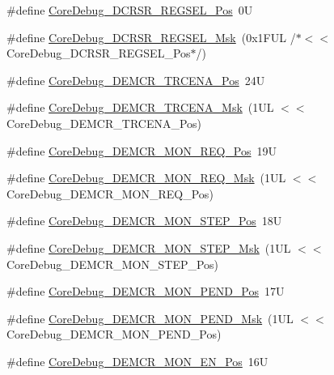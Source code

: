 \begin{DoxyCompactItemize}
\#define \hyperlink{group___c_m_s_i_s___core_debug_ga52182c8a9f63a52470244c0bc2064f7b}{Core\+Debug\+\_\+\+D\+C\+R\+S\+R\+\_\+\+R\+E\+G\+S\+E\+L\+\_\+\+Pos}~0U
\item 
\#define \hyperlink{group___c_m_s_i_s___core_debug_ga17cafbd72b55030219ce5609baa7c01d}{Core\+Debug\+\_\+\+D\+C\+R\+S\+R\+\_\+\+R\+E\+G\+S\+E\+L\+\_\+\+Msk}~(0x1\+F\+U\+L /$\ast$$<$$<$ Core\+Debug\+\_\+\+D\+C\+R\+S\+R\+\_\+\+R\+E\+G\+S\+E\+L\+\_\+\+Pos$\ast$/)
\item 
\#define \hyperlink{group___c_m_s_i_s___core_debug_ga6ff2102b98f86540224819a1b767ba39}{Core\+Debug\+\_\+\+D\+E\+M\+C\+R\+\_\+\+T\+R\+C\+E\+N\+A\+\_\+\+Pos}~24U
\item 
\#define \hyperlink{group___c_m_s_i_s___core_debug_ga5e99652c1df93b441257389f49407834}{Core\+Debug\+\_\+\+D\+E\+M\+C\+R\+\_\+\+T\+R\+C\+E\+N\+A\+\_\+\+Msk}~(1\+U\+L $<$$<$ Core\+Debug\+\_\+\+D\+E\+M\+C\+R\+\_\+\+T\+R\+C\+E\+N\+A\+\_\+\+Pos)
\item 
\#define \hyperlink{group___c_m_s_i_s___core_debug_ga341020a3b7450416d72544eaf8e57a64}{Core\+Debug\+\_\+\+D\+E\+M\+C\+R\+\_\+\+M\+O\+N\+\_\+\+R\+E\+Q\+\_\+\+Pos}~19U
\item 
\#define \hyperlink{group___c_m_s_i_s___core_debug_gae6384cbe8045051186d13ef9cdeace95}{Core\+Debug\+\_\+\+D\+E\+M\+C\+R\+\_\+\+M\+O\+N\+\_\+\+R\+E\+Q\+\_\+\+Msk}~(1\+U\+L $<$$<$ Core\+Debug\+\_\+\+D\+E\+M\+C\+R\+\_\+\+M\+O\+N\+\_\+\+R\+E\+Q\+\_\+\+Pos)
\item 
\#define \hyperlink{group___c_m_s_i_s___core_debug_ga9ae10710684e14a1a534e785ef390e1b}{Core\+Debug\+\_\+\+D\+E\+M\+C\+R\+\_\+\+M\+O\+N\+\_\+\+S\+T\+E\+P\+\_\+\+Pos}~18U
\item 
\#define \hyperlink{group___c_m_s_i_s___core_debug_ga2ded814556de96fc369de7ae9a7ceb98}{Core\+Debug\+\_\+\+D\+E\+M\+C\+R\+\_\+\+M\+O\+N\+\_\+\+S\+T\+E\+P\+\_\+\+Msk}~(1\+U\+L $<$$<$ Core\+Debug\+\_\+\+D\+E\+M\+C\+R\+\_\+\+M\+O\+N\+\_\+\+S\+T\+E\+P\+\_\+\+Pos)
\item 
\#define \hyperlink{group___c_m_s_i_s___core_debug_ga1e2f706a59e0d8131279af1c7e152f8d}{Core\+Debug\+\_\+\+D\+E\+M\+C\+R\+\_\+\+M\+O\+N\+\_\+\+P\+E\+N\+D\+\_\+\+Pos}~17U
\item 
\#define \hyperlink{group___c_m_s_i_s___core_debug_ga68ec55930269fab78e733dcfa32392f8}{Core\+Debug\+\_\+\+D\+E\+M\+C\+R\+\_\+\+M\+O\+N\+\_\+\+P\+E\+N\+D\+\_\+\+Msk}~(1\+U\+L $<$$<$ Core\+Debug\+\_\+\+D\+E\+M\+C\+R\+\_\+\+M\+O\+N\+\_\+\+P\+E\+N\+D\+\_\+\+Pos)
\item 
\#define \hyperlink{group___c_m_s_i_s___core_debug_ga802829678f6871863ae9ecf60a10425c}{Core\+Debug\+\_\+\+D\+E\+M\+C\+R\+\_\+\+M\+O\+N\+\_\+\+E\+N\+\_\+\+Pos}~16U

\end{DoxyCompactItemize}
